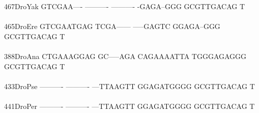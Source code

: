 \documentclass[11pt,twoside,reqno,a4paper]{article}
\begin{document}
{467\hspace*{1\charwidth}DroYak	GTCGAA----	----------	----------	-GAGA--GGG	GCGTTGACAG	T\\
\hspace*{4\charwidth}\hspace*{7\charwidth}\hspace*{1\charwidth}\hspace*{1\charwidth}\hspace*{1\charwidth}\hspace*{1\charwidth}\hspace*{1\charwidth}\\
465\hspace*{1\charwidth}DroEre	GTCGAATGAG	TCGA------	-----GAGTC	GGAGA--GGG	GCGTTGACAG	T\\
\hspace*{4\charwidth}\hspace*{7\charwidth}\hspace*{1\charwidth}\hspace*{1\charwidth}\hspace*{1\charwidth}\hspace*{1\charwidth}\hspace*{1\charwidth}\\
388\hspace*{1\charwidth}DroAna	CTGAAAGGAG	GC-----AGA	CAGAAAATTA	TGGGAGAGGG	GCGTTGACAG	T\\
\hspace*{4\charwidth}\hspace*{7\charwidth}\hspace*{1\charwidth}\hspace*{1\charwidth}\hspace*{1\charwidth}\hspace*{1\charwidth}\hspace*{1\charwidth}\\
433\hspace*{1\charwidth}DroPse	----------	----------	---TTAAGTT	GGAGATGGGG	GCGTTGACAG	T\\
\hspace*{4\charwidth}\hspace*{7\charwidth}\hspace*{1\charwidth}\hspace*{1\charwidth}\hspace*{1\charwidth}\hspace*{1\charwidth}\hspace*{1\charwidth}\\
441\hspace*{1\charwidth}DroPer	----------	----------	---TTAAGTT	GGAGATGGGG	GCGTTGACAG	T\\
}
\end{document}
